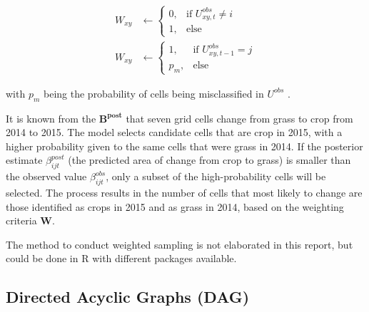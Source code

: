 \documentclass[
  letterpaper,
  DIV=11,
  numbers=noendperiod]{scrartcl}
\begin{document}
\[
\begin{align*}    W_{xy} &\leftarrow     \begin{cases}        0, & \text{if } U_{xy,t}^{obs} \neq i \\        1, & \text{else}    \end{cases}    \\    W_{xy} &\leftarrow     \begin{cases}        1, & \text{if } U_{xy,t-1}^{obs} = j \\        p_m, & \text{else}    \end{cases}\end{align*}
\]

with \(p_{m}\) being the probability of cells being misclassified in
\(U^{obs}\) .

\begin{tcolorbox}[enhanced jigsaw, toprule=.15mm, arc=.35mm, bottomtitle=1mm, colframe=quarto-callout-tip-color-frame, coltitle=black, rightrule=.15mm, leftrule=.75mm, titlerule=0mm, opacitybacktitle=0.6, bottomrule=.15mm, colback=white, toptitle=1mm, title=\textcolor{quarto-callout-tip-color}{\faLightbulb}\hspace{0.5em}{Example of weighted sampling operation}, breakable, left=2mm, opacityback=0, colbacktitle=quarto-callout-tip-color!10!white]

It is known from the \(\mathbf{B^{post}}\) that seven grid cells change
from grass to crop from 2014 to 2015. The model selects candidate cells
that are crop in 2015, with a higher probability given to the same cells
that were grass in 2014. If the posterior estimate
\(\beta_{ijt}^{post}\) (the predicted area of change from crop to grass)
is smaller than the observed value \(\beta_{ijt}^{obs}\), only a subset
of the high-probability cells will be selected. The process results in
the number of cells that most likely to change are those identified as
crops in 2015 and as grass in 2014, based on the weighting criteria
\(\mathbf{W}\).

\end{tcolorbox}

The method to conduct weighted sampling is not elaborated in this
report, but could be done in R with different packages available.

\hypertarget{directed-acyclic-graphs-dag}{%
\subsection{Directed Acyclic Graphs
(DAG)}\label{directed-acyclic-graphs-dag}}
\end{document}
